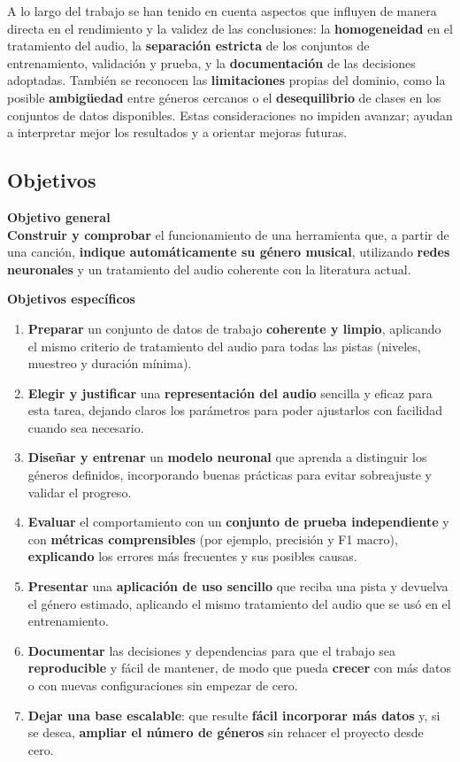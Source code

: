 \documentclass[12pt,twoside]{article}
\begin{document}
A lo largo del trabajo se han tenido en cuenta aspectos que influyen de manera directa en el rendimiento y la validez de las conclusiones: la \textbf{homogeneidad} en el tratamiento del audio, la \textbf{separación estricta} de los conjuntos de entrenamiento, validación y prueba, y la \textbf{documentación} de las decisiones adoptadas. También se reconocen las \textbf{limitaciones} propias del dominio, como la posible \textbf{ambigüedad} entre géneros cercanos o el \textbf{desequilibrio} de clases en los conjuntos de datos disponibles. Estas consideraciones no impiden avanzar; ayudan a interpretar mejor los resultados y a orientar mejoras futuras.

\subsection{Objetivos}

\noindent\textbf{Objetivo general}\\
\textbf{Construir y comprobar} el funcionamiento de una herramienta que, a partir de una canción, \textbf{indique automáticamente su género musical}, utilizando \textbf{redes neuronales} y un tratamiento del audio coherente con la literatura actual.

\vspace{0.5em}
\noindent\textbf{Objetivos específicos}
\begin{enumerate}
  \item \textbf{Preparar} un conjunto de datos de trabajo \textbf{coherente y limpio}, aplicando el mismo criterio de tratamiento del audio para todas las pistas (niveles, muestreo y duración mínima).
  \item \textbf{Elegir y justificar} una \textbf{representación del audio} sencilla y eficaz para esta tarea, dejando claros los parámetros para poder ajustarlos con facilidad cuando sea necesario.
  \item \textbf{Diseñar y entrenar} un \textbf{modelo neuronal} que aprenda a distinguir los géneros definidos, incorporando buenas prácticas para evitar sobreajuste y validar el progreso.
  \item \textbf{Evaluar} el comportamiento con un \textbf{conjunto de prueba independiente} y con \textbf{métricas comprensibles} (por ejemplo, precisión y F1 macro), \textbf{explicando} los errores más frecuentes y sus posibles causas.
  \item \textbf{Presentar} una \textbf{aplicación de uso sencillo} que reciba una pista y devuelva el género estimado, aplicando el mismo tratamiento del audio que se usó en el entrenamiento.
  \item \textbf{Documentar} las decisiones y dependencias para que el trabajo sea \textbf{reproducible} y fácil de mantener, de modo que pueda \textbf{crecer} con más datos o con nuevas configuraciones sin empezar de cero.
  \item \textbf{Dejar una base escalable}: que resulte \textbf{fácil incorporar más datos} y, si se desea, \textbf{ampliar el número de géneros} sin rehacer el proyecto desde cero.
\end{enumerate}
\end{document}
